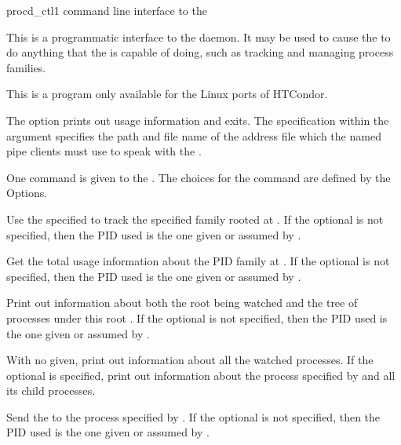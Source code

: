 \begin{ManPage}
{\label{man-procd-ctl}procd\_ctl}{1}
{command line interface to the }
\Synopsis {} 



\Description 

This is a programmatic interface to the  daemon. 
It may be used to 
cause the  to do anything that the 
is capable of doing,
such as tracking and managing process families.

This is a program only available for the Linux ports of HTCondor.

The  option prints out usage information and exits.
The   specification within the  argument
specifies the path and file name of the address file
which the named pipe clients must use to speak with the .

One command is given to the . 
The choices for the command are defined by the Options. 

\begin{Options}

  {Use the specified  to track the specified family rooted at 
  .  
  If the optional  is not specified, 
  then the PID used is the one given or assumed by .}

  {Get the total usage information about the PID family at .
  If the optional  is not specified, 
  then the PID used is the one given or assumed by .}

  {Print out information about both the root  being watched 
  and the tree of processes under this root .
  If the optional  is not specified, 
  then the PID used is the one given or assumed by .}

  {With no  given, print out information about all 
  the watched processes.  
  If the optional  is specified,
  print out information about the process specified by  
  and all its child processes.}

  {Send the  to the process specified by .
  If the optional  is not specified, 
  then the PID used is the one given or assumed by .}


\end{Options}
\end{ManPage}
